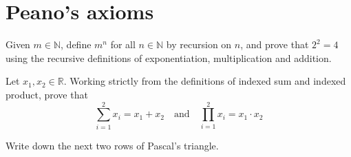 \section{Peano's axioms}


\begin{exercise}
Given $m \in \mathbb{N}$, define $m^n$ for all $n \in \mathbb{N}$ by recursion on $n$, and prove that $2^2 = 4$ using the recursive definitions of exponentiation, multiplication and addition.
\end{exercise}



\begin{exercise}
Let $x_1, x_2 \in \mathbb{R}$. Working strictly from the definitions of indexed sum and indexed product, prove that
\[ \sum_{i=1}^2 x_i = x_1 + x_2 \quad \text{and} \quad \prod_{i=1}^2 x_i = x_1 \cdot x_2 \]
\end{exercise}

\begin{exercise}
Write down the next two rows of Pascal's triangle.
\end{exercise}